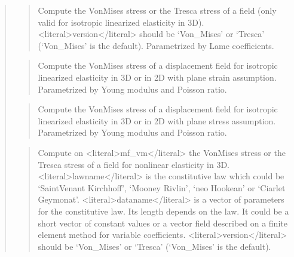 \documentclass[a4paper,11pt,english]{sphinxmanual}
\begin{document}
\begin{quote}
\begin{quote}
\sphinxAtStartPar
Compute the Von\sphinxhyphen{}Mises stress or the Tresca stress of a field (only
valid for isotropic linearized elasticity in 3D). \textless{}literal\textgreater{}version\textless{}/literal\textgreater{} should
be  ‘Von\_Mises’ or ‘Tresca’ (‘Von\_Mises’ is the default).
Parametrized by Lame coefficients.
\end{quote}

\sphinxAtStartPar
{}
\begin{quote}

\sphinxAtStartPar
Compute the Von\sphinxhyphen{}Mises stress  of a displacement field for isotropic
linearized elasticity in 3D or in 2D with plane strain assumption.
Parametrized by Young modulus and Poisson ratio.
\end{quote}

\sphinxAtStartPar
{}
\begin{quote}

\sphinxAtStartPar
Compute the Von\sphinxhyphen{}Mises stress  of a displacement field for isotropic
linearized elasticity in 3D or in 2D with plane stress assumption.
Parametrized by Young modulus and Poisson ratio.
\end{quote}

\sphinxAtStartPar
{}
\begin{quote}

\sphinxAtStartPar
Compute on \textless{}literal\textgreater{}mf\_vm\textless{}/literal\textgreater{} the Von\sphinxhyphen{}Mises stress or the Tresca stress of a field
for nonlinear elasticity in 3D. \textless{}literal\textgreater{}lawname\textless{}/literal\textgreater{} is the constitutive law which
could be ‘SaintVenant Kirchhoff’, ‘Mooney Rivlin’, ‘neo Hookean’ or
‘Ciarlet Geymonat’.
\textless{}literal\textgreater{}dataname\textless{}/literal\textgreater{} is a vector of parameters for the constitutive law. Its length
depends on the law. It could be a short vector of constant values or a
vector field described on a finite element method for variable coefficients.
\textless{}literal\textgreater{}version\textless{}/literal\textgreater{} should be  ‘Von\_Mises’ or ‘Tresca’ (‘Von\_Mises’ is the default).
\end{quote}


\end{quote}
\end{document}
